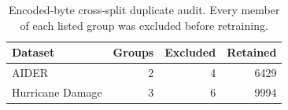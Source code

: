 \begin{table}[t]
\centering
\caption{Encoded-byte cross-split duplicate audit. Every member of each listed group was excluded before retraining.}
\label{tab:hash-audit}
\begin{tabular}{lrrr}
\toprule
Dataset & Groups & Excluded & Retained \\
\midrule
AIDER & 2 & 4 & 6429 \\
Hurricane Damage & 3 & 6 & 9994 \\
\bottomrule
\end{tabular}
\end{table}
